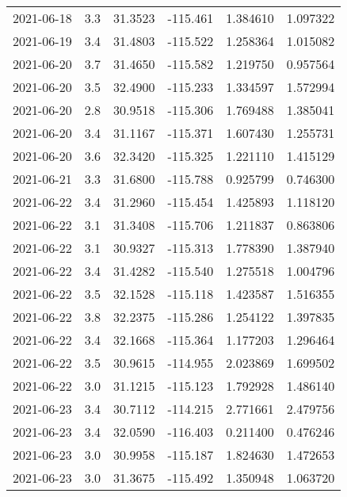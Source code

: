 \begin{tabular}{lrrrrr}
2021-06-18 &       3.3 &  31.3523 &  -115.461 &         1.384610 &         1.097322 \\
2021-06-19 &       3.4 &  31.4803 &  -115.522 &         1.258364 &         1.015082 \\
2021-06-20 &       3.7 &  31.4650 &  -115.582 &         1.219750 &         0.957564 \\
2021-06-20 &       3.5 &  32.4900 &  -115.233 &         1.334597 &         1.572994 \\
2021-06-20 &       2.8 &  30.9518 &  -115.306 &         1.769488 &         1.385041 \\
2021-06-20 &       3.4 &  31.1167 &  -115.371 &         1.607430 &         1.255731 \\
2021-06-20 &       3.6 &  32.3420 &  -115.325 &         1.221110 &         1.415129 \\
2021-06-21 &       3.3 &  31.6800 &  -115.788 &         0.925799 &         0.746300 \\
2021-06-22 &       3.4 &  31.2960 &  -115.454 &         1.425893 &         1.118120 \\
2021-06-22 &       3.1 &  31.3408 &  -115.706 &         1.211837 &         0.863806 \\
2021-06-22 &       3.1 &  30.9327 &  -115.313 &         1.778390 &         1.387940 \\
2021-06-22 &       3.4 &  31.4282 &  -115.540 &         1.275518 &         1.004796 \\
2021-06-22 &       3.5 &  32.1528 &  -115.118 &         1.423587 &         1.516355 \\
2021-06-22 &       3.8 &  32.2375 &  -115.286 &         1.254122 &         1.397835 \\
2021-06-22 &       3.4 &  32.1668 &  -115.364 &         1.177203 &         1.296464 \\
2021-06-22 &       3.5 &  30.9615 &  -114.955 &         2.023869 &         1.699502 \\
2021-06-22 &       3.0 &  31.1215 &  -115.123 &         1.792928 &         1.486140 \\
2021-06-23 &       3.4 &  30.7112 &  -114.215 &         2.771661 &         2.479756 \\
2021-06-23 &       3.4 &  32.0590 &  -116.403 &         0.211400 &         0.476246 \\
2021-06-23 &       3.0 &  30.9958 &  -115.187 &         1.824630 &         1.472653 \\
2021-06-23 &       3.0 &  31.3675 &  -115.492 &         1.350948 &         1.063720 \\

\end{tabular}
